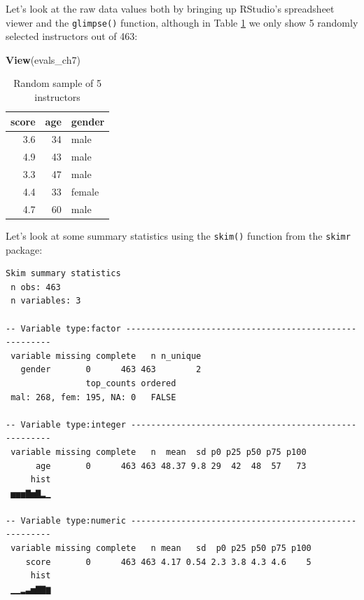 \documentclass[12pt, krantz2,]{krantz}
\makeatletter
\newenvironment{Shaded}{\begin{snugshade}}{\end{snugshade}}
\newcommand{\KeywordTok}[1]{\textcolor[rgb]{0.27,0.27,0.27}{\textbf{#1}}}
\newcommand{\NormalTok}[1]{#1}
\newcommand{\OperatorTok}[1]{\textcolor[rgb]{0.43,0.43,0.43}{\textbf{#1}}}
\newcommand{\StringTok}[1]{\textcolor[rgb]{0.5,0.5,0.5}{#1}}
\newenvironment{kframe}{%
\medskip{}
\setlength{\fboxsep}{.8em}
 \def\at@end@of@kframe{}%
 \ifinner\ifhmode%
  \def\at@end@of@kframe{\end{minipage}}%
  \begin{minipage}{\columnwidth}%
 \fi\fi%
 \def\FrameCommand##1{\hskip\@totalleftmargin \hskip-\fboxsep
 \colorbox{shadecolor}{##1}\hskip-\fboxsep
     \hskip-\linewidth \hskip-\@totalleftmargin \hskip\columnwidth}%
 \MakeFramed {\advance\hsize-\width
   \@totalleftmargin\z@ \linewidth\hsize
   \@setminipage}}%
 {\par\unskip\endMakeFramed%
 \at@end@of@kframe}
\renewenvironment{Shaded}{\begin{kframe}}{\end{kframe}}
\makeatother
\begin{document}
Let's look at the raw data values both by bringing up RStudio's spreadsheet viewer and the \texttt{glimpse()} function, although in Table \ref{tab:model4-data-preview} we only show 5 randomly selected instructors out of 463:

\begin{Shaded}
\begin{Highlighting}[]
\KeywordTok{View}\NormalTok{(evals_ch7)}
\end{Highlighting}
\end{Shaded}

\begin{table}[H]

\caption{\label{tab:model4-data-preview}Random sample of 5 instructors}
\centering
\fontsize{10}{12}\selectfont
\begin{tabular}{rrl}
\toprule
score & age & gender\\
\midrule
3.6 & 34 & male\\
4.9 & 43 & male\\
3.3 & 47 & male\\
4.4 & 33 & female\\
4.7 & 60 & male\\
\bottomrule
\end{tabular}
\end{table}

Let's look at some summary statistics using the \texttt{skim()} function from the \texttt{skimr} package:

\begin{Shaded}
\end{Shaded}

\begin{verbatim}
Skim summary statistics
 n obs: 463 
 n variables: 3 

-- Variable type:factor -------------------------------------------------------
 variable missing complete   n n_unique
   gender       0      463 463        2
                top_counts ordered
 mal: 268, fem: 195, NA: 0   FALSE

-- Variable type:integer ------------------------------------------------------
 variable missing complete   n  mean  sd p0 p25 p50 p75 p100
      age       0      463 463 48.37 9.8 29  42  48  57   73
     hist
 ▅▅▅▇▅▇▂▁

-- Variable type:numeric ------------------------------------------------------
 variable missing complete   n mean   sd  p0 p25 p50 p75 p100
    score       0      463 463 4.17 0.54 2.3 3.8 4.3 4.6    5
     hist
 ▁▁▂▃▅▇▇▆
\end{verbatim}
\end{document}
